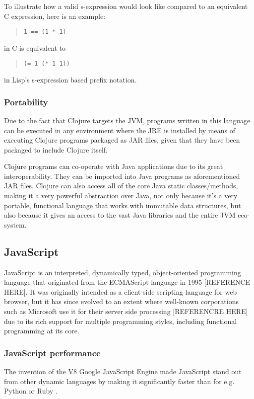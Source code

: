 To illustrate how a valid s-expression would look like compared to an equivalent C expression, here is an example:

\begin{quote}
\begin{verbatim}
1 == (1 * 1)
\end{verbatim}
\end{quote}
in C is equivalent to

\begin{quote}
\begin{verbatim}
(= 1 (* 1 1))
\end{verbatim}
\end{quote}
in Lisp's s-expression based prefix notation.

\subsubsection{Portability}
Due to the fact that Clojure targets the JVM, programs written in this language can be executed in any environment where the JRE is installed by means of executing Clojure programs packaged as JAR files, given that they have been packaged to include Clojure itself.  

Clojure programs can co-operate with Java applications due to its great interoperability. They can be imported into Java programs as aforementioned JAR files.
Clojure can also access all of the core Java static classes/methods, making it a very powerful abstraction over Java, not only because it's a very portable, functional language that works with immutable data structures, but also because it gives an access to the vast Java libraries and the entire JVM eco-system.

\subsection{JavaScript}
JavaScript is an interpreted, dynamically typed, object-oriented programming language that originated from the ECMAScript language in 1995 [REFERENCE HERE]. It was originally intended as a client side scripting language for web browser, but it has since evolved to an extent where well-known corporations such as Microsoft use it for their server side processing [REFERENCRE HERE] due to its rich support for multiple programming styles, including functional programming at its core.

\subsubsection{JavaScript performance}
The invention of the V8 Google JavaScript Engine made JavaScript stand out from other dynamic languages by making it significantly faster than for e.g. Python \cite{JavaScriptVSPython3} or Ruby \cite{JavaScriptVSRuby}.

